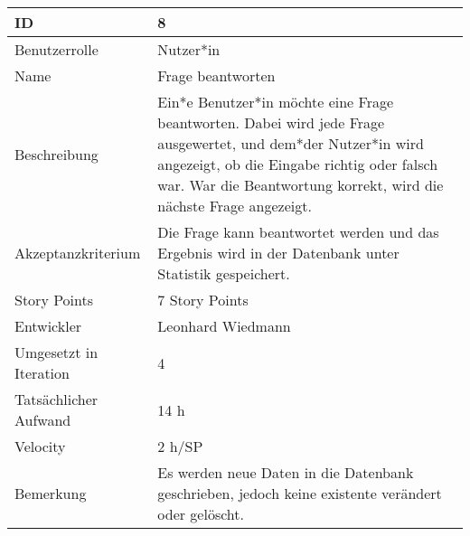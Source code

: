 \begin{tabularx}{\textwidth}{|p{}|X|}
	\hline
	ID & 8\\
	\hline
	Benutzerrolle & Nutzer*in\\
	\hline
	Name & Frage beantworten\\
	\hline
	Beschreibung & Ein*e Benutzer*in möchte eine Frage beantworten. Dabei wird jede Frage ausgewertet, und dem*der Nutzer*in wird angezeigt, ob die Eingabe richtig oder falsch war. War die Beantwortung korrekt, wird die nächste Frage angezeigt.\\
	\hline
	Akzeptanzkriterium & Die Frage kann beantwortet werden und das Ergebnis wird in der Datenbank unter Statistik gespeichert.\\
	\hline
	Story Points & 7 Story Points\\
	\hline
	Entwickler & Leonhard Wiedmann\\
	\hline
	Umgesetzt in Iteration & 4\\
	\hline
	Tatsächlicher Aufwand & 14 h\\
	\hline
	Velocity & 2 h/SP\\
	\hline
	Bemerkung & Es werden neue Daten in die Datenbank geschrieben, jedoch keine existente verändert oder gelöscht.\\
	\hline
\end{tabularx}
\vspace{20pt}
